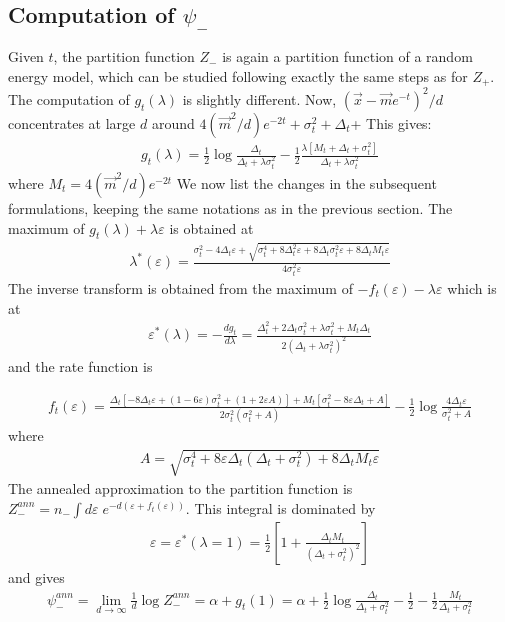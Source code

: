 \documentclass[10pt,twocolumn]{article}
\newcommand{\vx}{\vec x}
\newcommand{\vm}{\vec m}
\newcommand{\ve}{{\varepsilon}}
\begin{document}
\subsection{Computation of $\psi_-$}
Given $t$, the partition function $Z_-$ is again a partition function of a random energy model, which can be studied following exactly the same steps as for $Z_+$. The computation of $g_t(\lambda)$ is slightly different. Now, $(\vx-\vm e^{-t})^2/d$ concentrates at large $d$ around $4(\vm^2/d)e^{-2t}+\sigma_t^2+\Delta_t$+ This gives: 
\begin{align}
g_t(\lambda)=\frac{1}{2}\log \frac{\Delta_t}{\Delta_t+\lambda \sigma_t^2}- \frac{1}{2}\frac{\lambda [M_t +\Delta_t+\sigma_t^2]}{\Delta_t+\lambda \sigma_t^2}
\end{align}
where $M_t= 4 (\vm^2/d) e^{-2t}$
We now list the changes in the subsequent formulations, keeping the same notations as in the previous section. 
The maximum of $g_t(\lambda)+\lambda
 \ve$ is obtained at 
\begin{align}
    \lambda^*(\ve)= \frac{\sigma_t^2-4\Delta_t\ve +\sqrt{\sigma_t^4+8\Delta_t^2 \ve +8\Delta_t\sigma_t^2 \ve+8 \Delta_t M_t\ve}}{4\sigma_t^2 \ve}
\end{align}
The inverse transform is obtained from the maximum of $-f_t(\ve)-\lambda \ve$ which is at
\begin{align}
\ve^*(\lambda)= -\frac{d g_t}{d\lambda }= \frac{\Delta_t^2+2\Delta_t\sigma_t^2+\lambda \sigma_t^2+M_t\Delta_t
}{2(\Delta_t+\lambda \sigma_t^2)^2}
\end{align}
and the rate function is

\begin{align}
 f_t(\ve)=
\frac{\Delta_t\left[
-8\Delta_t\ve +(1-6 \ve)\sigma_t^2+(1+2 \ve A)
\right]
+M_t\left[ 
\sigma_t^2-8\ve \Delta_t+A
\right]
}{2\sigma_t^2 (\sigma_t^2+A)}
-\frac{1}{2}\log\frac{4\Delta_t\ve}{\sigma_t^2+A}
\end{align}
where
\begin{align}
    A=\sqrt{\sigma_t^4+8\ve \Delta_t (\Delta_t+\sigma_t^2)+8 \Delta_t M_t\ve}
\end{align}
The annealed approximation to the partition function is 
$Z_-^{ann}=n_-\int d \ve \; e^{-d (\ve+f_t(\ve)) }$. This integral is dominated by \begin{align}
\ve=\ve^*(\lambda=1)=\frac{1}{2} \left[1+\frac{\Delta_t M_t}{(\Delta_t+\sigma_t^2)^2}\right]
\end{align}
and gives 
\begin{align}
\psi_-^{ann}=\lim_{d\to\infty} \frac{1}{d}  \log Z_-^{ann} 
=\alpha+g_t(1)= \alpha+\frac{1}{2}\log\frac{\Delta_t}{\Delta_t+\sigma_t^2}-\frac{1}{2}- \frac{1}{2}\frac{M_t}{\Delta_t+\sigma_t^2}
\end{align}
\end{document}
